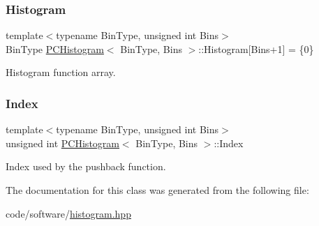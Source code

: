 \subsubsection{\texorpdfstring{Histogram}{Histogram}}
{\footnotesize\ttfamily template$<$typename Bin\+Type, unsigned int Bins$>$ \\
Bin\+Type \hyperlink{classPCHistogram}{P\+C\+Histogram}$<$ Bin\+Type, Bins $>$\+::Histogram\mbox{[}Bins+1\mbox{]} = \{0\}}



Histogram function array. 

\mbox{\label{classPCHistogram_a3d0371659763511d752c3348db978f79}} 
\subsubsection{\texorpdfstring{Index}{Index}}
{\footnotesize\ttfamily template$<$typename Bin\+Type, unsigned int Bins$>$ \\
unsigned int \hyperlink{classPCHistogram}{P\+C\+Histogram}$<$ Bin\+Type, Bins $>$\+::Index\hspace{0.3cm}{\ttfamily [private]}}



Index used by the pushback function. 



The documentation for this class was generated from the following file\+:\begin{DoxyCompactItemize}
\item 
code/software/\hyperlink{histogram_8hpp}{histogram.\+hpp}\end{DoxyCompactItemize}
